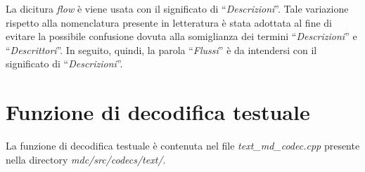 \begin{notabene}
La dicitura \textit{flow} \`e viene usata con il significato di ``\emph{Descrizioni}''. Tale variazione rispetto alla nomenclatura presente in letteratura \`e stata adottata al fine di evitare la possibile confusione dovuta alla somiglianza dei termini ``\emph{Descrizioni}'' e ``\emph{Descrittori}''. In seguito, quindi, la parola ``\emph{Flussi}'' \`e da intendersi con il significato di ``\emph{Descrizioni}''.
\end{notabene}

\section{Funzione di decodifica testuale}

La funzione di decodifica testuale \`e contenuta nel file \textit{text\_md\_codec.cpp} presente nella directory \textit{mdc/src/codecs/text/}.

